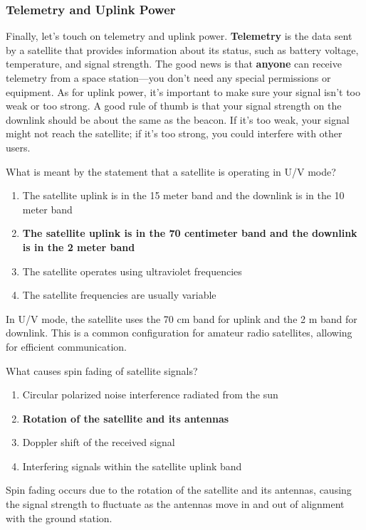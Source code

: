 \subsubsection*{Telemetry and Uplink Power}
Finally, let's touch on telemetry and uplink power. \textbf{Telemetry} is the data sent by a satellite that provides information about its status, such as battery voltage, temperature, and signal strength. The good news is that \textbf{anyone} can receive telemetry from a space station—you don't need any special permissions or equipment. As for uplink power, it's important to make sure your signal isn't too weak or too strong. A good rule of thumb is that your signal strength on the downlink should be about the same as the beacon. If it's too weak, your signal might not reach the satellite; if it's too strong, you could interfere with other users.

\begin{tcolorbox}[colback=gray!10!white,colframe=black!75!black,title={T8B08}]
What is meant by the statement that a satellite is operating in U/V mode?
\begin{enumerate}[label=\Alph*),noitemsep]
    \item The satellite uplink is in the 15 meter band and the downlink is in the 10 meter band
    \item \textbf{The satellite uplink is in the 70 centimeter band and the downlink is in the 2 meter band}
    \item The satellite operates using ultraviolet frequencies
    \item The satellite frequencies are usually variable
\end{enumerate}
\end{tcolorbox}
In U/V mode, the satellite uses the 70 cm band for uplink and the 2 m band for downlink. This is a common configuration for amateur radio satellites, allowing for efficient communication.

\begin{tcolorbox}[colback=gray!10!white,colframe=black!75!black,title={T8B09}]
What causes spin fading of satellite signals?
\begin{enumerate}[label=\Alph*),noitemsep]
    \item Circular polarized noise interference radiated from the sun
    \item \textbf{Rotation of the satellite and its antennas}
    \item Doppler shift of the received signal
    \item Interfering signals within the satellite uplink band
\end{enumerate}
\end{tcolorbox}
Spin fading occurs due to the rotation of the satellite and its antennas, causing the signal strength to fluctuate as the antennas move in and out of alignment with the ground station.

